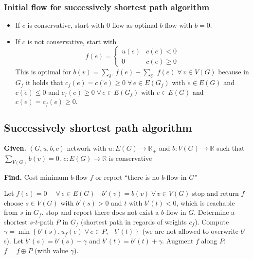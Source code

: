\documentclass[a4paper]{article}
\theoremstyle{definition}
\newcommand{\set}[1]{\left\{#1\right\}}
\newcommand{\given}[1]{\textbf{Given.} #1\par}
\newcommand{\find}[1]{\textbf{Find.} #1\par}
\newcommand{\gath}[2]{$#1$-$#2$-path} %
\newcommand{\fall}{\;\forall\,}
\begin{document}
\subsubsection{Initial flow for successively shortest path algorithm}
\begin{itemize}
  \item If $c$ is conservative, start with $0$-flow as optimal $b$-flow with $b=0$.
  \item If $c$ is not conservative, start with \[
      f(e) = \left\{\begin{array}{cc}
        u(e) & c(e) < 0 \\
        0    & c(e) \geq 0
      \end{array}\right.
    \]
    This is optimal for $b(v) = \sum_{\delta^+} f(e) - \sum_{\delta^-} f(e) \fall v \in V(G)$ because in $G_f$ it holds that $c_f(e) = c(\overleftarrow{e}) \geq 0 \fall e \in E(G_f)$ with $\overleftarrow{e} \in E(G)$ and $c(\overleftarrow{e}) \leq 0$ and $c_f(e) \geq 0 \fall e \in E(G_f)$ with $e \in E(G)$ and $c(e) = c_f(e) \geq 0$.
\end{itemize}

\subsection{Successively shortest path algorithm}
%
\begin{algorithm}
  \caption{Successively shortest path algorithm}
  \label{succ-shortest-path-algo}
  \given{$(G, u, b, c)$ network with $u: E(G) \rightarrow \mathbb{R}_+$ and $b: V(G) \rightarrow \mathbb{R}$ such that $\sum_{V(G)} b(v) = 0$. $c: E(G) \rightarrow \mathbb{R}$ is conservative}
  \find{Cost minimum $b$-flow $f$ or report ``there is no $b$-flow in $G$''}
\begin{algorithmic}[1]
  \State Let $f(e) = 0 \quad \fall e \in E(G) \quad b'(v) = b(v) \fall v \in V(G)$
    \If{$b'(v) = 0 \fall v \in V(G)$}\label{ssp-algo-step-2}
      \State stop and return $f$
    \Else
      \State choose $s \in V(G)$ with $b'(s) > 0$ and $t$ with $b'(t) < 0$, which is reachable from $s$ in $G_f$.
        \State stop and report there does not exist a $b$-flow in $G$.
      \EndIf
    \EndIf
  \State Determine a shortest \gath st $P$ in $G_f$ (shortest path in regards of weights $c_f$).
  \State Compute $\gamma = \min\set{b'(s), u_f(e) \fall e \in P, -b'(t)}$ (we are not allowed to overwrite $b'$s).
  \State Let $b'(s) = b'(s) - \gamma$ and $b'(t) = b'(t) + \gamma$.
  \State Augment $f$ along $P$: $f = f \oplus P$ (with value $\gamma$).
\end{algorithmic}
\end{algorithm}
\end{document}
